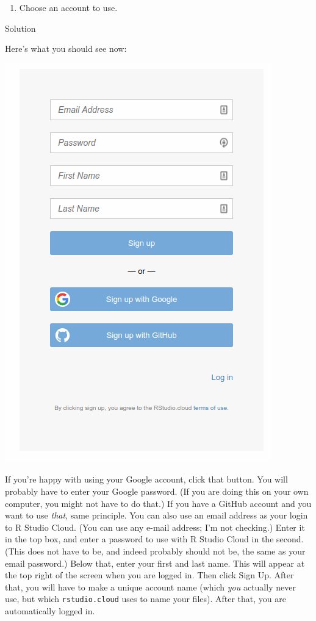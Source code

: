 \documentclass[]{tufte-book}
\providecommand{\tightlist}{%
  \setlength{\itemsep}{0pt}\setlength{\parskip}{0pt}}
\theoremstyle{definition}
\theoremstyle{definition}
\theoremstyle{definition}
\theoremstyle{remark}
\begin{document}
\begin{enumerate}
\def\labelenumi{(\alph{enumi})}
\setcounter{enumi}{1}
\tightlist
\item
  Choose an account to use.
\end{enumerate}

Solution

Here's what you should see now:

\includegraphics{Screenshot_2018-07-02_14-44-18.png}

If you're happy with using your Google account, click that button. You
will probably have to enter your Google password. (If you are doing this
on your own computer, you might not have to do that.) If you have a
GitHub account and you want to use \emph{that}, same principle. You can
also use an email address as your login to R Studio Cloud. (You can use
any e-mail address; I'm not checking.) Enter it in the top box, and
enter a password to use with R Studio Cloud in the second. (This does
not have to be, and indeed probably should not be, the same as your
email password.) Below that, enter your first and last name. This will
appear at the top right of the screen when you are logged in. Then click
Sign Up. After that, you will have to make a unique account name (which
\emph{you} actually never use, but which \texttt{rstudio.cloud} uses to
name your files). After that, you are automatically logged in.
\end{document}
